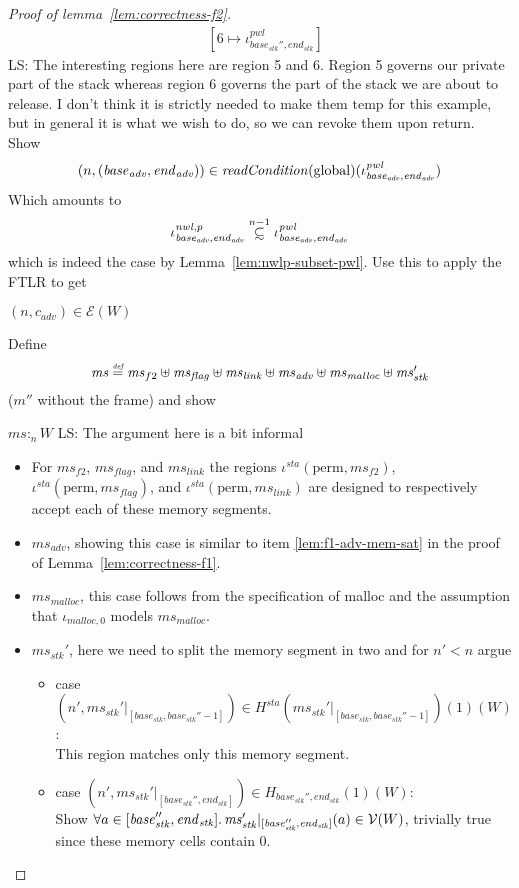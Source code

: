 \documentclass[a4paper]{article}
\newcommand{\defeq}{\stackrel{\textit{\tiny{def}}}{=}}
\newcommand\subsetsim{\mathrel{\ooalign{\raise.2ex\hbox{$\subset$}\cr
      \hidewidth\lower.8ex\hbox{\scalebox{0.9}{$\sim$}}\hidewidth\cr}}}
\newcommand{\nsubsim}[1][n]{\stackrel{\tiny{#1}}{\subsetsim}}
\newcommand\lau[1]{{\color{purple} \sf \footnotesize {LS: #1}}\\}
\newcommand{\var}[1]{\mathit{#1}}
\newcommand{\hs}{\var{ms}}
\newcommand{\ms}{\hs}
\newcommand{\start}{\var{base}}
\newcommand{\addrend}{\var{end}}
\newcommand{\heap}{\var{mem}}
\newcommand{\adv}{\var{adv}}
\newcommand{\link}{\var{link}}
\newcommand{\stk}{\var{stk}}
\newcommand{\flag}{\var{flag}}
\newcommand{\nwl}{\var{nwl}}
\newcommand{\pwl}{\var{pwl}}
\newcommand{\sta}{\var{sta}}
\newcommand{\plainfun}[2]{
  \ifthenelse{\equal{#2}{}}
  {\mathit{#1}}
  {\mathit{#1}(#2)}
}
\newcommand{\readCond}[1]{\plainfun{readCondition}{#1}}
\newcommand{\heapSat}[3][\heap]{#1 :_{#2} #3}
\newcommand{\codelabel}[1]{\mathit{#1}}
\newcommand{\malloc}{\codelabel{malloc}}
\newcommand{\asmType}{\plaindom{AsmType}}
\newcommand{\plaindom}[1]{\mathrm{#1}}
\newcommand{\intr}[2]{\mathcal{#1}}
\newcommand{\valueintr}[1]{\intr{V}{#1}}
\newcommand{\exprintr}[1]{\intr{E}{#1}}
\newcommand{\stdvr}{\valueintr{\asmType}}
\newcommand{\stder}{\exprintr{\asmType}}
\newcommand{\npair}[2][n]{\left(#1,#2 \right)}
\newcommand{\plainperm}[1]{\mathrm{#1}}
\newcommand{\glob}{\plainperm{global}}
\newcommand{\plainview}[1]{\mathrm{#1}}
\newcommand{\perma}{\plainview{perm}}
\newcommand{\temp}{\plainview{temp}}
\begin{document}
\begin{proof}[Proof of lemma~\ref{lem:correctness-f2}]
\begin{align*}
          & [6 \mapsto \iota^\pwl_{\start_\stk'', \addrend_\stk}]
  \end{align*}
  \lau{The interesting regions here are region 5 and 6. Region 5 governs our private part of the stack whereas region 6 governs the part of the stack we are about to release. I don't think it is strictly needed to make them $\temp$ for this example, but in general it is what we wish to do, so we can revoke them upon return.}
  Show
  \[
    \npair{(\start_\adv,\addrend_\adv)}\in\readCond{}(\glob)(\iota^\pwl_{\start_\adv,\addrend_\adv})
  \]
  Which amounts to
  \[
    \iota^{\nwl,p}_{\start_\adv,\addrend_\adv} \nsubsim[n-1] \iota^\pwl_{\start_\adv,\addrend_\adv}
  \]
  which is indeed the case by Lemma~\ref{lem:nwlp-subset-pwl}. Use this to apply the FTLR to get 
  \begin{enumproof}
  \item $\npair{c_\adv} \in \stder(W)$ \label{lem:f2-adv-er}
  \end{enumproof}
  Define
  \[
    \ms  \defeq \hs_{f2} \uplus 
    \hs_\flag \uplus                
    \ms_\link \uplus 
    \hs_\adv \uplus 
    \ms_\malloc \uplus 
    \ms_\stk'
  \]
  ($m''$ without the frame) and show
  \begin{enumproof}[resume]
  \item $\heapSat[\ms]{n}{W}$ \label{lem:f2-mem-sat}\lau{The argument here is a bit informal}
    \begin{itemize}
    \item For $\hs_{f2}$, $\hs_\flag$, and $\ms_\link$ the regions $\iota^\sta(\perma,\ms_{f2})$,$\iota^\sta (\perma,\ms_\flag)$, and $\iota^\sta (\perma,\ms_\link)$ are designed to respectively accept each of these memory segments.
    \item $\hs_\adv$, showing this case is similar to item \ref{lem:f1-adv-mem-sat} in the proof of Lemma~\ref{lem:correctness-f1}.
    \item $\ms_\malloc$, this case follows from the specification of malloc and the assumption that $\iota_{\malloc,0}$ models $\ms_\malloc$.    
    \item $\ms_\stk'$, here we need to split the memory segment in two and for $n' < n$ argue
      \begin{itemize}
      \item case $\npair[n']{\ms_\stk'|_{[\start_\stk, \start_\stk''-1]}} \in
        H^\sta(\ms_\stk'|_{[\start_\stk,\start_\stk''-1]})(1)(W)$ :\\ This region matches only this memory segment.
      \item case $\npair[n']{\ms_\stk'|_{[\start_\stk'', \addrend_\stk]}} \in H_{\start_\stk'', \addrend_\stk}(1)(W)$:\\ Show $\forall a \in [\start_\stk'', \addrend_\stk] \ldotp \ms_\stk'|_{[\start_\stk'', \addrend_\stk]}(a) \in \stdvr(W)$, trivially true since these memory cells contain 0. 

\end{itemize}
\end{itemize}
\end{enumproof}
\end{proof}
\end{document}
